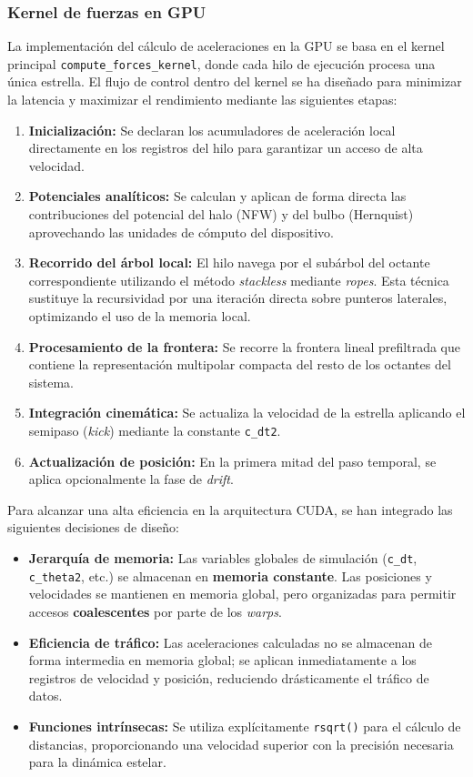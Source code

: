 \subsubsection{Kernel de fuerzas en GPU}

La implementación del cálculo de aceleraciones en la GPU se basa en el kernel principal \texttt{compute\_forces\_kernel}, donde cada hilo de ejecución procesa una única estrella.
El flujo de control dentro del kernel se ha diseñado para minimizar la latencia y maximizar el rendimiento mediante las siguientes etapas:

\begin{enumerate}
    \item \textbf{Inicialización:} Se declaran los acumuladores de aceleración local directamente en los registros del hilo para garantizar un acceso de alta velocidad.
    \item \textbf{Potenciales analíticos:} Se calculan y aplican de forma directa las contribuciones del potencial del halo (NFW) y del bulbo (Hernquist) aprovechando las unidades de cómputo del dispositivo.
    \item \textbf{Recorrido del árbol local:} El hilo navega por el subárbol del octante correspondiente utilizando el método \textit{stackless} mediante \textit{ropes}. Esta técnica sustituye la recursividad por una iteración directa sobre punteros laterales, optimizando el uso de la memoria local.
    \item \textbf{Procesamiento de la frontera:} Se recorre la frontera lineal prefiltrada que contiene la representación multipolar compacta del resto de los octantes del sistema.
    \item \textbf{Integración cinemática:} Se actualiza la velocidad de la estrella aplicando el semipaso (\textit{kick}) mediante la constante \texttt{c\_dt2}.
    \item \textbf{Actualización de posición:} En la primera mitad del paso temporal, se aplica opcionalmente la fase de \textit{drift}.
\end{enumerate}

Para alcanzar una alta eficiencia en la arquitectura CUDA, se han integrado las siguientes decisiones de diseño:
\begin{itemize}
    \item \textbf{Jerarquía de memoria:} Las variables globales de simulación (\texttt{c\_dt}, \texttt{c\_theta2}, etc.) se almacenan en \textbf{memoria constante}. Las posiciones y velocidades se mantienen en memoria global, pero organizadas para permitir accesos \textbf{coalescentes} por parte de los \textit{warps}.
    \item \textbf{Eficiencia de tráfico:} Las aceleraciones calculadas no se almacenan de forma intermedia en memoria global; se aplican inmediatamente a los registros de velocidad y posición, reduciendo drásticamente el tráfico de datos.
    \item \textbf{Funciones intrínsecas:} Se utiliza explícitamente \texttt{rsqrt()} para el cálculo de distancias, proporcionando una velocidad superior con la precisión necesaria para la dinámica estelar.
\end{itemize}

